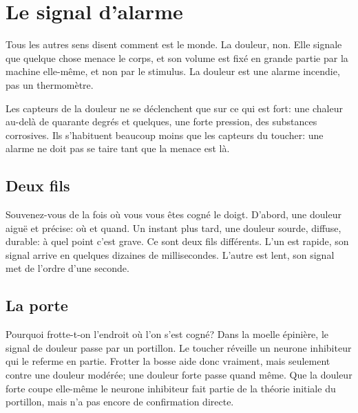 \chapter{Le signal d'alarme}


Tous les autres sens disent comment est le monde. La douleur, non. Elle signale que quelque chose menace le corps, et son volume est fixé en grande partie par la machine elle-même, et non par le stimulus. La douleur est une alarme incendie, pas un thermomètre.

Les capteurs de la douleur ne se déclenchent que sur ce qui est fort: une chaleur au-delà de quarante degrés et quelques, une forte pression, des substances corrosives. Ils s'habituent beaucoup moins que les capteurs du toucher: une alarme ne doit pas se taire tant que la menace est là.

\section*{Deux fils}

Souvenez-vous de la fois où vous vous êtes cogné le doigt. D'abord, une douleur aiguë et précise: où et quand. Un instant plus tard, une douleur sourde, diffuse, durable: à quel point c'est grave. Ce sont deux fils différents. L'un est rapide, son signal arrive en quelques dizaines de millisecondes. L'autre est lent, son signal met de l'ordre d'une seconde.

\section*{La porte}

Pourquoi frotte-t-on l'endroit où l'on s'est cogné? Dans la moelle épinière, le signal de douleur passe par un \og portillon\fg{}. Le toucher réveille un neurone inhibiteur qui le referme en partie. Frotter la bosse aide donc vraiment, mais seulement contre une douleur modérée; une douleur forte passe quand même. Que la douleur forte coupe elle-même le neurone inhibiteur fait partie de la théorie initiale du portillon, mais n'a pas encore de confirmation directe.


